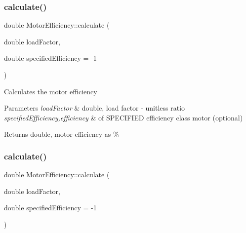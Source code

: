 \mbox{\label{class_motor_efficiency_ace29950c3155ea4befd7961e28376e23}} 
\subsubsection{\texorpdfstring{calculate()}{calculate()}\hspace{0.1cm}{\footnotesize\ttfamily [2/3]}}
{\footnotesize\ttfamily double Motor\+Efficiency\+::calculate (\begin{DoxyParamCaption}\item[{double}]{load\+Factor,  }\item[{double}]{specified\+Efficiency = {\ttfamily -\/1} }\end{DoxyParamCaption})}

Calculates the motor efficiency 
\begin{DoxyParams}{Parameters}
{\em load\+Factor} & double, load factor -\/ unitless ratio \\
\hline
{\em specified\+Efficiency,efficiency} & of S\+P\+E\+C\+I\+F\+I\+ED efficiency class motor (optional) \\
\hline
\end{DoxyParams}
\begin{DoxyReturn}{Returns}
double, motor efficiency as \% 
\end{DoxyReturn}
\mbox{\label{class_motor_efficiency_ace29950c3155ea4befd7961e28376e23}} 
\subsubsection{\texorpdfstring{calculate()}{calculate()}\hspace{0.1cm}{\footnotesize\ttfamily [3/3]}}
{\footnotesize\ttfamily double Motor\+Efficiency\+::calculate (\begin{DoxyParamCaption}\item[{double}]{load\+Factor,  }\item[{double}]{specified\+Efficiency = {\ttfamily -\/1} }\end{DoxyParamCaption})}

